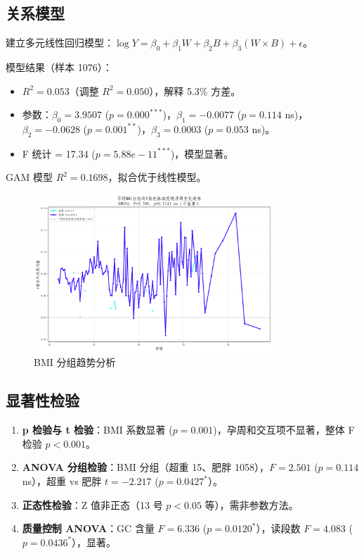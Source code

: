 \documentclass[withoutpreface,bwprint]{cumcmthesis} %
\begin{document}
\subsection{关系模型}

建立多元线性回归模型：$\log Y = \beta_0 + \beta_1 W + \beta_2 B + \beta_3 (W \times B) + \epsilon$。

模型结果（样本 1076）：
\begin{itemize}
    \item $R^2 = 0.053$（调整 $R^2 = 0.050$），解释 5.3\% 方差。
    \item 参数：$\beta_0 = 3.9507$ ($p=0.000^{***}$)，$\beta_1 = -0.0077$ ($p=0.114$ ns)，$\beta_2 = -0.0628$ ($p=0.001^{**}$)，$\beta_3 = 0.0003$ ($p=0.053$ ns)。
    \item F 统计 = 17.34 ($p=5.88e-11^{***}$)，模型显著。
\end{itemize}

GAM 模型 $R^2 = 0.1698$，拟合优于线性模型。

\begin{figure}[h]
    \centering
    \includegraphics[width=0.8\textwidth]{../code/fig-1-2-y_chromosome_by_bmi_week_with_anova.png}
    \caption{BMI 分组趋势分析}
    \label{fig:trend}
\end{figure}

\subsection{显著性检验}

\begin{enumerate}
    \item \textbf{p 检验与 t 检验}：BMI 系数显著 ($p=0.001$)，孕周和交互项不显著，整体 F 检验 $p<0.001$。
    \item \textbf{ANOVA 分组检验}：BMI 分组（超重 15、肥胖 1058），$F=2.501$ ($p=0.114$ ns），超重 vs 肥胖 $t=-2.217$ ($p=0.0427^*$）。
    \item \textbf{正态性检验}：Z 值非正态（13 号 $p<0.05$ 等），需非参数方法。
    \item \textbf{质量控制 ANOVA}：GC 含量 $F=6.336$ ($p=0.0120^*$），读段数 $F=4.083$ ($p=0.0436^*$），显著。
\end{enumerate}
\end{document}
